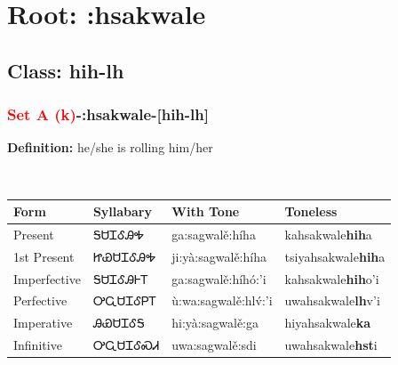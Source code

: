 \needspace{4in}
\section*{Root: :hsakwale}
\nopagebreak
{}
\needspace{3in}
\subsection*{Class: hih-lh}
\nopagebreak
\needspace{2in}
\subsubsection*{\textcolor{Red}{Set A (k)}{-}\textbf{:hsakwale}{-}[hih-lh]}
\nopagebreak
\textbf{Definition: } he/she is rolling him/her
\\[0.5em]
\begin{tabularx}{\textwidth}{l X X X}%
\toprule%
\textbf{Form}&\textbf{Syllabary}&\textbf{With Tone}&\textbf{Toneless}\\%
\midrule%
Present&ᎦᏌᏆᎴᎯᎭ&ga:sagwalě:híha&kahsakwale\textbf{hih}a\\%
1st Present&ᏥᏯᏌᏆᎴᎯᎭ&ji:yà:sagwalě:híha&tsiyahsakwale\textbf{hih}a\\%
Imperfective&ᎦᏌᏆᎴᎯᎰᎢ&ga:sagwalě:híhó:’i&kahsakwale\textbf{hih}o'i\\%
Perfective&ᎤᏩᏌᏆᎴᏢᎢ&ù:wa:sagwalě:hlv́:’i&uwahsakwale\textbf{lh}v'i\\%
Imperative&ᎯᏯᏌᏆᎴᎦ&hi:yà:sagwalě:ga&hiyahsakwale\textbf{ka}\\%
Infinitive&ᎤᏩᏌᏆᎴᏍᏗ&uwa:sagwalě:sdi&uwahsakwale\textbf{hst}i\\%
\bottomrule%
\end{tabularx}
\\[1em]